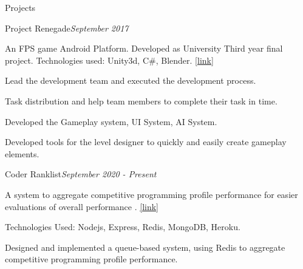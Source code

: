 \documentclass{resume}
\begin{document}
\begin{rSection}{Projects} 

\begin{rSubsection}{Project Renegade}{\em September 2017}{}{}{}
\item An FPS game Android Platform. Developed as University Third year final project. Technologies used: Unity3d, C\#, Blender. \href{https://knights-of-orange.itch.io/project-renegade}{[link]}
\item Lead the development team and executed the development process.
\item Task distribution and help team members to complete their task in time.
\item Developed the Gameplay system, UI System, AI System.
\item Developed tools for the level designer to quickly and easily create gameplay elements.
\end{rSubsection}

\begin{rSubsection}{Coder Ranklist}{\em September 2020 - Present}{}{}{}
\item A system to aggregate competitive programming profile performance  for easier evaluations of overall performance . \href{https://github.com/CLown1331/coder-ranklist-backend}{[link]}
\item Technologies Used: Nodejs, Express, Redis, MongoDB, Heroku.
\item Designed and implemented a queue-based system, using Redis to aggregate competitive programming profile performance.
\end{rSubsection}

\end{rSection}
\end{document}
